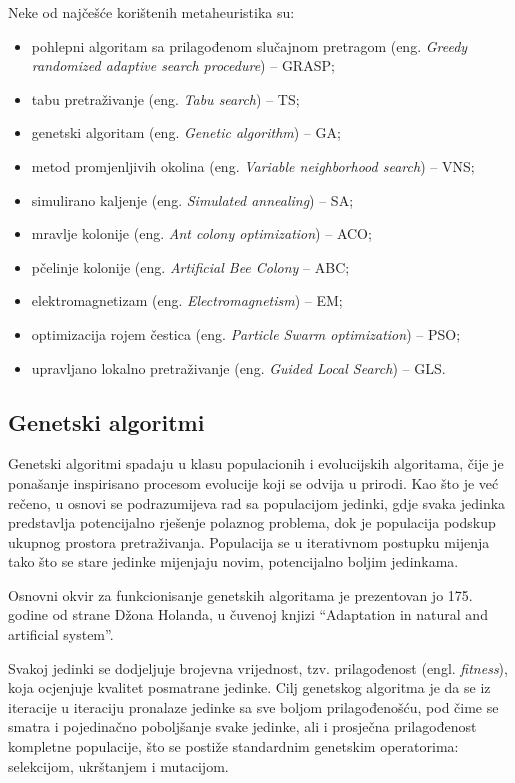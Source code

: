 \documentclass[a4paper, utf8, 11pt, colorlinks]{book}
\begin{document}
 Neke od najčešće korištenih metaheuristika su:
 \begin{itemize}
 	\item pohlepni algoritam sa prilagođenom slučajnom pretragom (eng. \emph{Greedy randomized adaptive search procedure}) -- GRASP;
 	\item tabu pretraživanje (eng. \emph{Tabu search}) -- TS;
 	\item genetski algoritam (eng. \emph{Genetic algorithm}) -- GA;
 	\item metod promjenljivih okolina (eng. \emph{Variable neighborhood search}) -- VNS;
 	\item simulirano kaljenje (eng. \emph{Simulated annealing}) -- SA;
 	\item mravlje kolonije (eng. \emph{Ant colony optimization}) -- ACO;
 	\item pčelinje kolonije (eng. \emph{Artificial Bee Colony} -- ABC;
 	\item elektromagnetizam (eng. \emph{Electromagnetism}) -- EM;
 	\item optimizacija rojem čestica (eng. \emph{Particle Swarm optimization}) -- PSO;
 	\item upravljano lokalno pretraživanje (eng. \emph{Guided Local Search})  -- GLS.
 \end{itemize}


\subsection{Genetski algoritmi}\label{intro:ga}


Genetski algoritmi spadaju u klasu populacionih i evolucijskih algoritama, čije je ponašanje inspirisano procesom evolucije koji se odvija u prirodi.
Kao što je već rečeno, u osnovi se podrazumijeva rad sa populacijom jedinki, gdje svaka jedinka predstavlja potencijalno rješenje polaznog problema, dok je populacija  podskup ukupnog prostora pretraživanja. Populacija se u iterativnom postupku mijenja tako što se stare jedinke mijenjaju novim, potencijalno boljim jedinkama.

Osnovni okvir za funkcionisanje genetskih algoritama je prezentovan jo 175. godine od strane Džona Holanda, u čuvenoj knjizi ``Adaptation in natural and artificial system''.

Svakoj jedinki se dodjeljuje brojevna vrijednost, tzv. prilagođenost (engl.  \emph{fitness}), koja ocjenjuje kvalitet posmatrane jedinke. Cilj genetskog algoritma je da se iz iteracije u iteraciju pronalaze jedinke sa sve boljom prilagođenošću, pod čime se smatra i pojedinačno poboljšanje svake jedinke, ali i prosječna prilagođenost kompletne populacije, što se postiže standardnim genetskim operatorima: selekcijom, ukrštanjem i mutacijom.
\end{document}
